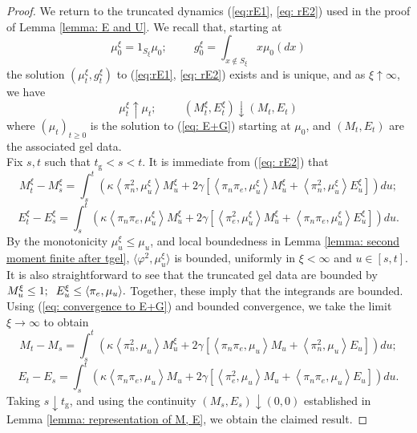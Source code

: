 \begin{proof} We return to the truncated dynamics (\ref{eq:rE1}, \ref{eq: rE2}) used in the proof of Lemma \ref{lemma: E and U}. We recall that, starting at \begin{equation} \mu^\xi_0 = 1_{S_\xi}\mu_0; \hspace{1cm} g^\xi_0=\int_{x\not\in S_\xi} x\mu_0(dx)\end{equation} the solution $(\mu^\xi_t, g^\xi_t)$ to (\ref{eq:rE1}, \ref{eq: rE2}) exists and is unique, and as $\xi\uparrow \infty$, we have \begin{equation} \label{eq: convergence to E+G}
    \mu^\xi_t\uparrow \mu_t; \hspace{1cm} (M^\xi_t, E^\xi_t)\downarrow (M_t, E_t)
\end{equation} where $(\mu_t)_{t\ge 0}$ is the solution to (\ref{eq: E+G}) starting at $\mu_0$, and $(M_t, E_t)$ are the associated gel data. \medskip \\ Fix $s, t$ such that $t_\mathrm{g}<s<t$. It is immediate from (\ref{eq: rE2}) that \begin{equation}
    M^\xi_t-M^\xi_s=\int_{s}^t 
    \left(
      \kappa \left<\pi_n^2,\mu^\xi_u\right>M^\xi_u +
      2\gamma \left[
        \left<\pi_n \pi_e,\mu^\xi_u \right>M^\xi_u +
        \left<\pi_n^2,\mu^\xi_u \right>E^\xi_u \right]
    \right)du;
\end{equation}
\begin{equation}
    E^\xi_t-E^\xi_s=\int_{s}^t 
    \left(
      \kappa \left<\pi_n \pi_e,\mu^\xi_u\right>M^\xi_u +
      2\gamma \left[
        \left<\pi_e^2,\mu^\xi_u \right>M^\xi_u +
        \left<\pi_n \pi_e,\mu^\xi_u \right>E^\xi_u \right]
    \right)du.
\end{equation} By the monotonicity $\mu^\xi_u \le \mu_u$, and local boundedness in Lemma \ref{lemma: second moment finite after tgel},  $\langle \varphi^2, \mu^\xi_u\rangle $ is bounded, uniformly in $\xi<\infty$ and $u\in [s,t]$. It is also  straightforward to see that the truncated gel data are bounded by $M^\xi_u \le 1;\hspace{0.2cm} E^\xi_u \le \langle \pi_e, \mu_u\rangle.$ Together, these imply that the integrands are bounded. Using (\ref{eq: convergence to E+G}) and bounded convergence, we take the limit $\xi \rightarrow \infty$ to obtain  \begin{equation}
    M_t-M_s=\int_{s}^t 
    \left(
      \kappa \left<\pi_n^2,\mu_u\right>M^\xi_u +
      2\gamma \left[
        \left<\pi_n \pi_e,\mu_u \right>M_u +
        \left<\pi_n^2,\mu_u \right>E_u \right]
    \right)du;
\end{equation}
\begin{equation}
    E_t-E_s=\int_{s}^t 
    \left(
      \kappa \left<\pi_n \pi_e,\mu_u\right>M_u +
      2\gamma \left[
        \left<\pi_e^2,\mu_u \right>M_u +
        \left<\pi_n \pi_e,\mu_u \right>E_u \right]
    \right)du.
\end{equation} Taking $s\downarrow t_\mathrm{g}$, and using the continuity $(M_s, E_s)\downarrow (0,0)$ established in Lemma \ref{lemma: representation of M, E}, we obtain the claimed result. \end{proof}